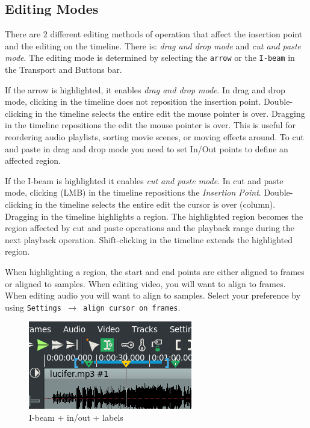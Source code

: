 \subsection{Editing Modes}%
\label{sub:editing_modes}

There are 2 different editing methods of operation that affect the insertion point and the editing on the timeline.  
There is:  \emph{drag and drop mode} and \emph{cut and paste mode}. 
The editing mode is determined by selecting the \texttt{arrow} or the \texttt{I-beam} in the Transport and Buttons bar. 

If the arrow is highlighted, it enables \emph{drag and drop mode}.  
In drag and drop mode, clicking in the timeline does not reposition the insertion point.  
Double-clicking in the timeline selects the entire edit the mouse pointer is over.  
Dragging in the timeline repositions the edit the mouse pointer is over. 
This is useful for reordering audio playlists, sorting movie scenes, or moving effects around. 
To cut and paste in drag and drop mode you need to set In/Out points to define an affected region. 

If the I-beam is highlighted it enables \emph{cut and paste mode}. 
In cut and paste mode, clicking (LMB) in the timeline repositions the \textit{Insertion Point}. 
Double-clicking in the timeline selects the entire edit the cursor is over (column). 
Dragging in the timeline highlights a region. 
The highlighted region becomes the region affected by cut and paste operations and the playback range during the next playback operation. 
Shift-clicking in the timeline extends the highlighted region.

When highlighting a region, the start and end points are either aligned to frames or aligned to samples. When editing video, you will want to align to frames. When editing audio you will want to align to samples. Select your preference by using \texttt{Settings $\rightarrow$ align cursor on frames}.

\begin{figure}[htpb]
    \centering
    \includegraphics[width=0.4\linewidth]{images/i-beam.png}
    \caption{I-beam + in/out  +  labels}
    \label{fig:i-beam}
\end{figure}

